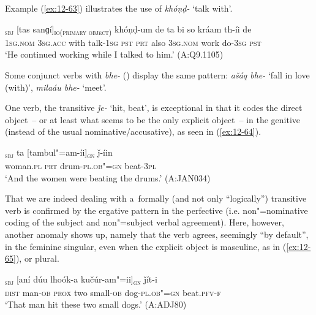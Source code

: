 Example (\ref{ex:12-63}) illustrates the use of \textit{khóṇḍ-} `talk with'.

\begin{exe}
\ex
\label{ex:12-63}
\gll [ma]\textsubscript{\textsc{sbj}} [tas sanɡí]\textsubscript{\textsc{io(primary object)}} khóṇḍ-um de ta bi so kráam th-íi de \\
\textsc{1sg.nom} \textsc{3sg.acc} with talk-\textsc{1sg} \textsc{pst}  \textsc{prt} also \textsc{3sg.nom} work do-\textsc{3sg} \textsc{pst} \\
\glt `He continued working while I talked to him.' (A:Q9.1105)
\end{exe}

Some conjunct verbs with \textit{bhe-} () display the same pattern: \textit{ašáq bhe-} `fall in love (with)', \textit{milaáu bhe-} `meet'.


 One verb, the transitive \textit{ǰe-} `hit, beat', is exceptional in that it codes the direct object~-- or at least what seems to be the only explicit object~-- in the genitive (instead of the usual nominative/accusative), as seen in (\ref{ex:12-64}).

\begin{exe}
\ex
\label{ex:12-64}
\gll [kuṛíina]\textsubscript{\textsc{sbj}} ta [tambul"=am-íi]\textsubscript{\textsc{gn}} ǰ-íin  \\
woman.\textsc{pl} \textsc{prt} drum-\textsc{pl.ob"=gn} beat-\textsc{3pl}  \\
\glt `And the women were beating the drums.' (A:JAN034)
\end{exe}

That we are indeed dealing with a~formally (and not only ``logically'') transitive verb is confirmed by the ergative pattern in the perfective (i.e. non"=nominative coding of the subject and non"=subject verbal agreement). Here, however, another anomaly shows up, namely that the verb agrees, seemingly ``by default'', in the feminine singular, even when the explicit object is masculine, as in (\ref{ex:12-65}), or plural.

\begin{exe}
\ex
\label{ex:12-65}
\textsubscript{\textsc{sbj}} [aní dúu lhoók-a kučúr-am"=ii]\textsubscript{\textsc{gn}} ǰít-i \\
\textsc{dist} man-\textsc{ob} \textsc{prox} two small-\textsc{ob} dog-\textsc{pl.ob"=gn} beat.\textsc{pfv-f} \\
\glt `That man hit these two small dogs.' (A:ADJ80)
\end{exe}

